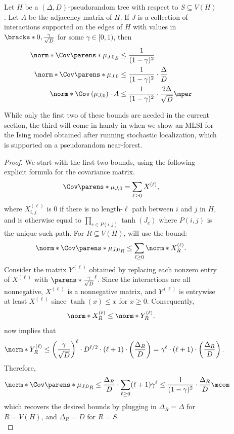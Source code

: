 \documentclass[11pt,letterpaper]{article}
\begin{document}
\begin{figure}
    \begin{lemma} \label{lem:tree-cov}
        Let $H$ be a $(\Delta,D)$-pseudorandom tree with respect to $S\subseteq V(H)$. Let $A$ be the adjacency matrix of $H$.
        If $J$ is a collection of interactions supported on the edges of $H$ with values in $\bracks*{0, \frac{\gamma}{\sqrt{D}}}$ for some $\gamma \in [0,1)$, then
        \begin{align*}
            \norm*{\Cov\parens*{\mu_{J,0}}_S} &\le \frac{1}{(1-\gamma)^2} \\
            \norm*{\Cov\parens*{\mu_{J,0}}} &\le \frac{1}{(1-\gamma)^2}\cdot\frac{\Delta}{D} \\
            \norm*{\Cov\left(\mu_{J,0}\right) \cdot A} &\le \frac{1}{(1-\gamma)^2} \cdot \frac{2\Delta}{\sqrt{D}} \mper
        \end{align*}
    \end{lemma}
    While only the first two of these bounds are needed in the current section, the third will come in handy in  when we show an MLSI for the Ising model obtained after running stochastic localization, which is supported on a pseudorandom near-forest.
    \begin{proof}
        We start with the first two bounds, using the following explicit formula for the covariance matrix.
        \[
            \Cov\parens*{\mu_{J,0}} = \sum_{\ell\ge 0} X^{(\ell)},
        \]
        where $X^{(\ell)}_{i,j}$ is $0$ if there is no length-$\ell$ path between $i$ and $j$ in $H$, and is otherwise equal to $\prod_{e\in P(i,j)} \tanh(J_e)$ where $P(i,j)$ is the unique such path.
        For $R\subseteq V(H)$, will use the bound:
        \begin{equation}
            \label{eq:trace-moment-cov-bound-ez}
            \norm*{\Cov\parens*{\mu_{J,0}}_R} \le \sum_{\ell\ge 0} \norm*{X^{(\ell)}_R}.
        \end{equation}
        Consider the matrix $Y^{(\ell)}$ obtained by replacing each nonzero entry of $X^{(\ell)}$ with $\parens*{\frac{\gamma}{\sqrt{D}}}^{\ell}$.
        Since the interactions are all nonnegative, $X^{(\ell)}$ is a nonnegative matrix, and $Y^{(\ell)}$ is entrywise at least $X^{(\ell)}$ since $\tanh(x) \le x$ for $x \ge 0$. 
        Consequently,
        \begin{equation}
            \label{eq:trace-moment-termwise-bound-ez}
            \norm*{X^{(\ell)}_R} \le \norm*{Y^{(\ell)}_R}.
        \end{equation}
         now implies that
        \[ \norm*{Y^{(\ell)}_R} \le \left( \frac{\gamma}{\sqrt{D}} \right)^{\ell} \cdot D^{\ell/2} \cdot (\ell+1) \cdot \left(\frac{\Delta_R}{D}\right) = \gamma^{\ell} \cdot (\ell+1) \cdot \left(\frac{\Delta_R}{D}\right). \]
        Therefore,
        \[
            \norm*{\Cov\parens*{\mu_{J,0}}_R} \le \frac{\Delta_R}{D} \cdot \sum_{\ell \ge 0} (\ell+1) \gamma^{\ell} \le \frac{1}{(1-\gamma)^2}\cdot\frac{\Delta_R}{D}\mcom
        \]
        which recovers the desired bounds by plugging in $\Delta_R = \Delta$ for $R = V(H)$, and $\Delta_R = D$ for $R=S$.\\


\end{proof}
\end{figure}
\end{document}
